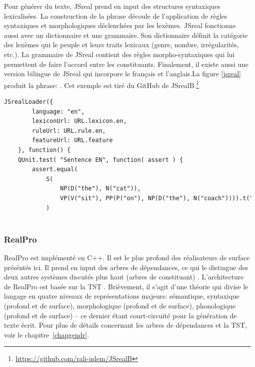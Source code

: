 Pour générer du texte, JSreal prend en input des structures syntaxiques lexicalisées. La construction de la phrase découle de l'application de règles syntaxiques et morphologiques déclenchées par les lexèmes. JSreal fonctionne aussi avec un dictionnaire et une grammaire. Son dictionnaire définit la catégorie des lexèmes qui le peuple et leurs traits lexicaux (genre, nombre, irrégularités, etc.). La grammaire de JSreal contient des règles morpho-syntaxiques qui lui permettent de faire l'accord entre les constituants. Finalement, il existe aussi une version bilingue de JSreal \citep{MolinsJSrealBBilingualText2015} qui incorpore le français et l'anglais.La figure \ref{jsreal} produit la phrase: . Cet exemple est tiré du GitHub de JSrealB.\footnote{\url{https://github.com/rali-udem/JSrealB}}

\begin{lstlisting}[language=Xml, caption=JSreal, label=jsreal]
JSrealLoader({
        language: "en",
        lexiconUrl: URL.lexicon.en,
        ruleUrl: URL.rule.en,
        featureUrl: URL.feature
    }, function() {
    QUnit.test( "Sentence EN", function( assert ) {
        assert.equal(
            S(
                NP(D("the"), N("cat")),
                VP(V("sit"), PP(P("on"), NP(D("the"), N("coach")))).t("ps")
            )
        
\end{lstlisting}
		
\subsubsection{RealPro}
RealPro \citep{LavoieFastPortableRealizer1997} est implémenté en C++. Il est le plus profond des réalisateurs de surface préséntés ici. Il prend en input des arbres de dépendances, ce qui le distingue des deux autres systèmes discutés plus haut (arbres de constituant) \citep{DaoustJSREALTextRealizer2015,GattSimpleNLGRealisationEngine2009}. L'architecture de RealPro est basée sur la \ac{TST} \citep{melcuk1988}. Brièvement, il s'agit d'une théorie qui divise le langage en quatre niveaux de représentations majeurs: sémantique, syntaxique (profond et de surface), morphologique (profond et de surface), phonologique (profond et de surface) -- ce dernier étant court-circuité pour la génération de texte écrit. Pour plus de détails concernant les arbres de dépendances et la \ac{TST}, voir le chapitre~\ref{chapgendr}.

